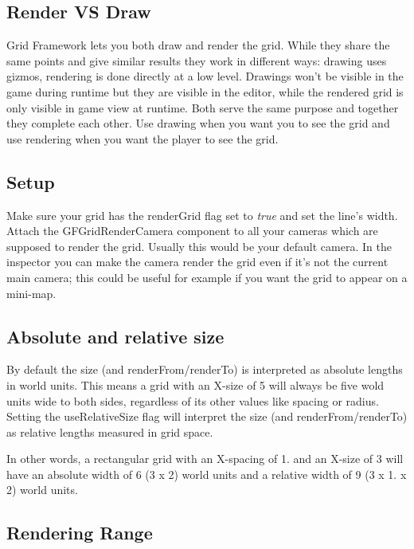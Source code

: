 \subsection*{Render V\+S Draw }

Grid Framework lets you both draw and render the grid. While they share the same points and give similar results they work in different ways\+: drawing uses gizmos, rendering is done directly at a low level. Drawings won’t be visible in the game during runtime but they are visible in the editor, while the rendered grid is only visible in game view at runtime. Both serve the same purpose and together they complete each other. Use drawing when you want you to see the grid and use rendering when you want the player to see the grid.

\subsection*{Setup }

Make sure your grid has the {\ttfamily render\+Grid} flag set to {\itshape true} and set the line’s width. Attach the {\ttfamily G\+F\+Grid\+Render\+Camera} component to all your cameras which are supposed to render the grid. Usually this would be your default camera. In the inspector you can make the camera render the grid even if it’s not the current main camera; this could be useful for example if you want the grid to appear on a mini-\/map.

\subsection*{Absolute and relative size }

By default the size (and {\ttfamily render\+From}/{\ttfamily render\+To}) is interpreted as absolute lengths in world units. This means a grid with an X-\/size of 5 will always be five wold units wide to both sides, regardless of its other values like spacing or radius. Setting the {\ttfamily use\+Relative\+Size} flag will interpret the {\ttfamily size} (and {\ttfamily render\+From}/{\ttfamily render\+To}) as relative lengths measured in grid space.

In other words, a rectangular grid with an X-\/{\ttfamily spacing} of 1. and an X-\/{\ttfamily size} of 3 will have an absolute width of 6 (3 x 2) world units and a relative width of 9 (3 x 1. x 2) world units.

\subsection*{Rendering Range }

